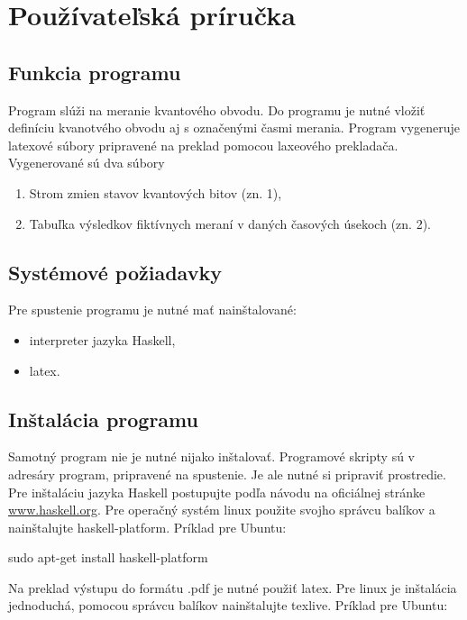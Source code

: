 
\chapter{Používateľská príručka}

\section{Funkcia programu}

Program slúži na meranie kvantového obvodu. Do programu je nutné vložiť 
definíciu kvanotvého obvodu aj s označenými časmi merania. Program vygeneruje
latexové súbory pripravené na preklad pomocou laxeového prekladača. 
Vygenerované sú dva súbory
\begin{enumerate}
    \item Strom zmien stavov kvantových bitov (zn. 1),
    \item Tabuľka výsledkov fiktívnych meraní v daných časových úsekoch (zn. 2).
\end{enumerate}

\section{Systémové požiadavky}

Pre spustenie programu je nutné mať nainštalované: 
\begin{itemize}
    \item interpreter jazyka Haskell,
    \item latex.
\end{itemize}

\section{Inštalácia programu}

Samotný program nie je nutné nijako inštalovať. Programové skripty sú v 
adresáry program, pripravené na spustenie. Je ale nutné si pripraviť prostredie.
Pre inštaláciu jazyka Haskell postupujte podľa návodu na oficiálnej 
stránke \url{www.haskell.org}. Pre operačný systém linux použite svojho
správcu balíkov a nainštalujte haskell-platform. Príklad pre Ubuntu:

\begin{code}
sudo apt-get install haskell-platform
\end{code}

Na preklad výstupu do formátu .pdf je nutné použiť latex. Pre linux je
inštalácia jednoduchá, pomocou správcu balíkov nainštalujte texlive. Príklad
pre Ubuntu:

